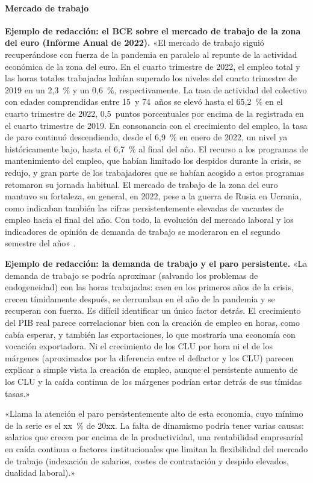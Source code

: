 \documentclass[11pt]{article}
\begin{document}
\paragraph{Mercado de trabajo}
\begin{anotaciones}
\textbf{Ejemplo de redacción: el BCE sobre el mercado de trabajo de la zona del euro (Informe Anual de 2022).}
«El mercado de trabajo siguió recuperándose con fuerza de la pandemia en paralelo al repunte de la actividad económica de la zona del euro. En el cuarto trimestre de 2022, el empleo total y las horas totales trabajadas habían superado los niveles del cuarto trimestre de 2019 en un 2,3~\% y un 0,6~\%, respectivamente. La tasa de actividad del colectivo con edades comprendidas entre 15~y 74~años se elevó hasta el 65,2~\% en el cuarto trimestre de 2022, 0,5~puntos porcentuales por encima de la registrada en el cuarto trimestre de 2019. En consonancia con el crecimiento del empleo, la tasa de paro continuó descendiendo, desde el 6,9~\% en enero de 2022, un nivel ya históricamente bajo, hasta el 6,7~\% al final del año. El recurso a los programas de mantenimiento del empleo, que habían limitado los despidos durante la crisis, se redujo, y gran parte de los trabajadores que se habían acogido a estos programas retomaron su jornada habitual. El mercado de trabajo de la zona del euro mantuvo su fortaleza, en general, en 2022, pese a la guerra de Rusia en Ucrania, como indicaban también las cifras persistentemente elevadas de vacantes de empleo hacia el final del año. Con todo, la evolución del mercado laboral y los indicadores de opinión de demanda de trabajo se moderaron en el segundo semestre del año» \parencite{BCE2023InformeAnual2022}.
\end{anotaciones}

\begin{anotaciones}
\textbf{Ejemplo de redacción: la demanda de trabajo y el paro persistente.}
«La demanda de trabajo se podría aproximar (salvando los problemas de endogeneidad) con las horas trabajadas: caen en los primeros años de la crisis, crecen tímidamente después, se derrumban en el año de la pandemia y se recuperan con fuerza. Es difícil identificar un único factor detrás. El crecimiento del PIB real parece correlacionar bien con la creación de empleo en horas, como cabía esperar, y también las exportaciones, lo que mostraría una economía con vocación exportadora. Ni el crecimiento de los CLU por hora ni el de los márgenes (aproximados por la diferencia entre el deflactor y los CLU) parecen explicar a simple vista la creación de empleo, aunque el persistente aumento de los CLU y la caída continua de los márgenes podrían estar detrás de sus tímidas tasas.»

«Llama la atención el paro persistentemente alto de esta economía, cuyo mínimo de la serie es el xx~\% de 20xx. La falta de dinamismo podría tener varias causas: salarios que crecen por encima de la productividad, una rentabilidad empresarial en caída continua o factores institucionales que limitan la flexibilidad del mercado de trabajo (indexación de salarios, costes de contratación y despido elevados, dualidad laboral).»
\end{anotaciones}
\end{document}
